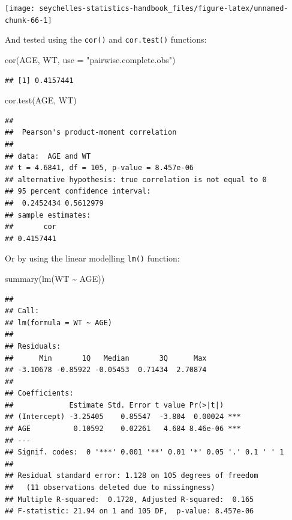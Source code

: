 \documentclass[
  12pt,
]{book}
\newenvironment{Shaded}{\begin{snugshade}}{\end{snugshade}}
\newcommand{\AttributeTok}[1]{\textcolor[rgb]{0.77,0.63,0.00}{#1}}
\newcommand{\FunctionTok}[1]{\textcolor[rgb]{0.00,0.00,0.00}{#1}}
\newcommand{\NormalTok}[1]{#1}
\newcommand{\SpecialCharTok}[1]{\textcolor[rgb]{0.00,0.00,0.00}{#1}}
\newcommand{\StringTok}[1]{\textcolor[rgb]{0.31,0.60,0.02}{#1}}
\begin{document}
\begin{center}\texttt{[image: seychelles-statistics-handbook\_files/figure-latex/unnamed-chunk-66-1]} \end{center}

\newpage

And tested using the \texttt{cor()} and \texttt{cor.test()} functions:

\begin{Shaded}
\begin{Highlighting}[]
\FunctionTok{cor}\NormalTok{(AGE, WT, }\AttributeTok{use =} \StringTok{"pairwise.complete.obs"}\NormalTok{)}
\end{Highlighting}
\end{Shaded}

\begin{verbatim}
## [1] 0.4157441
\end{verbatim}

\begin{Shaded}
\begin{Highlighting}[]
\FunctionTok{cor.test}\NormalTok{(AGE, WT)}
\end{Highlighting}
\end{Shaded}

\begin{verbatim}
## 
##  Pearson's product-moment correlation
## 
## data:  AGE and WT
## t = 4.6841, df = 105, p-value = 8.457e-06
## alternative hypothesis: true correlation is not equal to 0
## 95 percent confidence interval:
##  0.2452434 0.5612979
## sample estimates:
##       cor 
## 0.4157441
\end{verbatim}

\newpage

Or by using the linear modelling \texttt{lm()} function:

\begin{Shaded}
\begin{Highlighting}[]
\FunctionTok{summary}\NormalTok{(}\FunctionTok{lm}\NormalTok{(WT }\SpecialCharTok{\textasciitilde{}}\NormalTok{ AGE))}
\end{Highlighting}
\end{Shaded}

\begin{verbatim}
## 
## Call:
## lm(formula = WT ~ AGE)
## 
## Residuals:
##      Min       1Q   Median       3Q      Max 
## -3.10678 -0.85922 -0.05453  0.71434  2.70874 
## 
## Coefficients:
##             Estimate Std. Error t value Pr(>|t|)    
## (Intercept) -3.25405    0.85547  -3.804  0.00024 ***
## AGE          0.10592    0.02261   4.684 8.46e-06 ***
## ---
## Signif. codes:  0 '***' 0.001 '**' 0.01 '*' 0.05 '.' 0.1 ' ' 1
## 
## Residual standard error: 1.128 on 105 degrees of freedom
##   (11 observations deleted due to missingness)
## Multiple R-squared:  0.1728, Adjusted R-squared:  0.165 
## F-statistic: 21.94 on 1 and 105 DF,  p-value: 8.457e-06
\end{verbatim}
\end{document}
